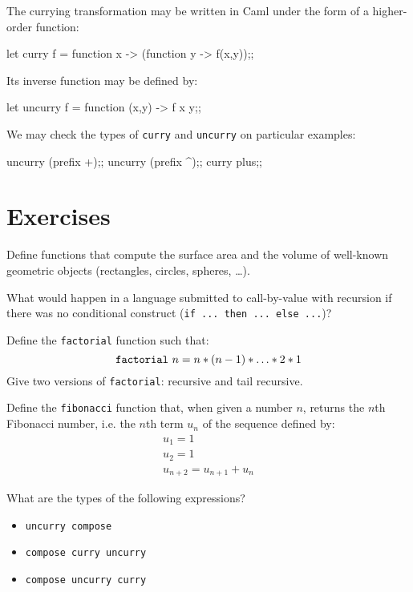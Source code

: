 The currying transformation may be written in Caml under the form of a
higher-order function:
\begin{caml_example}
let curry f = function x -> (function y -> f(x,y));;
\end{caml_example}
Its inverse function may be defined by:
\begin{caml_example}
let uncurry f = function (x,y) -> f x y;;
\end{caml_example}
We may check the types of {\tt curry} and {\tt uncurry} on particular
examples:
\begin{caml_example}
uncurry (prefix +);;
uncurry (prefix ^);;
curry plus;;
\end{caml_example}

\section*{Exercises}
%
\begin{exo}\label{Basic:1}
Define functions that compute the surface area and the volume of
well-known geometric objects (rectangles, circles, spheres, \ldots).
\end{exo}
%
\begin{exo}\label{Basic:2}
What would happen in a language submitted to call-by-value with
recursion if there was no conditional construct ({\tt if ... then ... else ...})?
\end{exo}
\begin{exo}\label{Basic:3}
Define the {\tt factorial} function such that:
\[{\tt factorial}~n = n * (n-1) * \ldots * 2 * 1\]
Give two versions of {\tt factorial}: recursive and tail recursive.
\end{exo}
\begin{exo}\label{Basic:5}
Define the {\tt fibonacci} function that, when given a number $n$,
returns the $n$th Fibonacci number, i.e. the $n$th term $u_n$ of the
sequence defined by:
\[\begin{array}{l}
u_1 = 1\\
u_2 = 1\\
u_{n+2} = u_{n+1} + u_n
\end{array}\]
\end{exo}
\begin{exo}\label{Basic:6}
What are the types of the following expressions?
\begin{itemize}
\item {\tt uncurry compose}
\item {\tt compose curry uncurry}
\item {\tt compose uncurry curry}
\end{itemize}
\end{exo}
